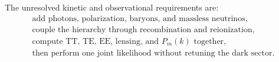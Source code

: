 The unresolved kinetic and observational requirements are:
\begin{equation}
 \boxed{
 \begin{gathered}
 \text{add photons, polarization, baryons, and massless neutrinos},\\
 \text{couple the hierarchy through recombination and reionization},\\
 \text{compute TT, TE, EE, lensing, and }P_m(k)\text{ together},\\
 \text{then perform one joint likelihood without retuning the dark sector}.
 \end{gathered}}
 \label{eq:cb-open-requirements}
\end{equation}
